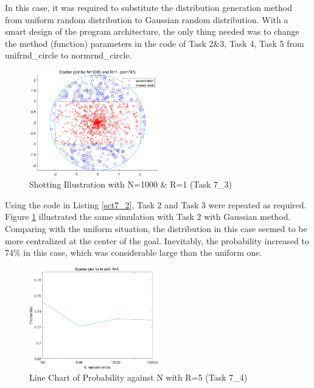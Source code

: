 \documentclass[11pt, a4paper]{article}
\begin{document}
In this case, it was required to substitute the distribution generation method from uniform random distribution to Gaussian random distribution. With a smart design of the program architecture, the only thing needed was to change the method (function) parameters in the code of Task 2\&3, Task 4, Task 5 from unifrnd\_circle to normrnd\_circle.

\begin{figure}[htbp]     \begin{centering}
    \includegraphics[width=0.5\textwidth]{img/t7_3.png}
    \caption{Shotting Illustration with N=1000 \& R=1 (Task 7\_3)}
    \label{Fig:task7_3}
    \end{centering}
\end{figure}

\newpage

Using the code in Listing \ref{sct7_2}, Task 2 and Task 3 were repeated as required. Figure \ref{Fig:task7_3} illustrated the same simulation with Task 2 with Gaussian method. Comparing with the uniform situation, the distribution in this case seemed to be more centralized at the center of the goal. Inevitably, the probability increased to 74\% in this case, which was considerable large than the uniform one.

\begin{figure}[htbp]     \begin{centering}
    \includegraphics[width=0.5\textwidth]{img/t7_4.png}
    \caption{Line Chart of Probability against N with R=5 (Task 7\_4)}
    \label{Fig:task7_4}
    \end{centering}
\end{figure}
\end{document}
